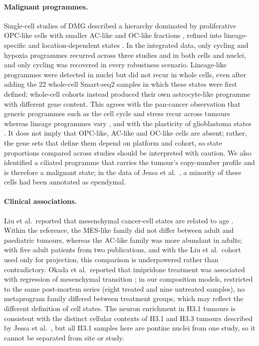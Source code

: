 \documentclass[11pt,a4paper]{article}
\begin{document}
\paragraph{Malignant programmes.} Single-cell studies of DMG described a hierarchy dominated by proliferative OPC-like
cells with smaller AC-like and OC-like fractions \citep{filbin2018developmental}, refined into lineage-specific and
location-dependent states \citep{jessa2022km,liu2022landscape}. In the integrated data, only cycling and hypoxia
programmes recurred across three studies and in both cells and nuclei, and only cycling was recovered in every robustness
scenario. Lineage-like programmes were detected in nuclei but did not recur in whole cells, even after adding the 22
whole-cell Smart-seq2 samples in which these states were first defined; whole-cell cohorts instead produced their own
astrocyte-like programme with different gene content. This agrees with the pan-cancer observation that generic programmes
such as the cell cycle and stress recur across tumours whereas lineage programmes vary \citep{gavish2023hallmarks}, and
with the plasticity of glioblastoma states \citep{neftel2019integrative}. It does not imply that OPC-like, AC-like and
OC-like cells are absent; rather, the gene sets that define them depend on platform and cohort, so state proportions
compared across studies should be interpreted with caution. We also identified a ciliated programme that carries the
tumour's copy-number profile and is therefore a malignant state; in the data of Jessa et al.\ \citep{jessa2022km}, a
minority of these cells had been annotated as ependymal.

\paragraph{Clinical associations.} Liu et al.\ reported that mesenchymal cancer-cell states are related to age
\citep{liu2022landscape}. Within the reference, the MES-like family did not differ between adult and paediatric tumours,
whereas the AC-like family was more abundant in adults; with five adult patients from two publications, and with the
Liu et al.\ cohort used only for projection, this comparison is underpowered rather than contradictory. Okada et al.\
reported that imipridone treatment was associated with regression of mesenchymal transition \citep{okada2026singlenucleus};
in our composition models, restricted to the same post-mortem series (eight treated and nine untreated samples), no
metaprogram family differed between treatment groups, which may reflect the different definition of cell states. The
neuron enrichment in H3.1 tumours is consistent with the distinct cellular contexts of H3.1 and H3.3 tumours described by
Jessa et al.\ \citep{jessa2022km}, but all H3.1 samples here are pontine nuclei from one study, so it cannot be separated
from site or study.
\end{document}
